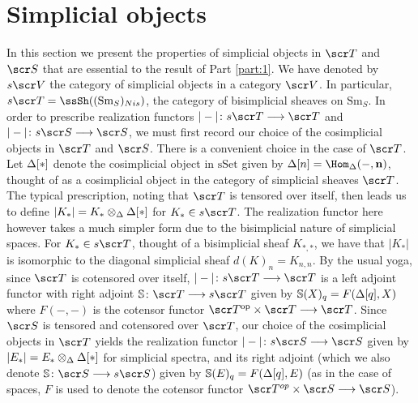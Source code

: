 \documentclass{amsart}
\theoremstyle{definition}
\begin{document}
\section{Simplicial objects}\label{sec:simpob}
In this section we present the properties of simplicial objects in $\sT$ and $\sS$ that are essential to the result of Part \ref{part:1}. We have denoted by $s\sV$ the category of simplicial objects in a category $\sV$. In particular, $s\sT = \ssSh((\mathrm{Sm}_S)_{Nis})$, the category of bisimplicial sheaves on $\mathrm{Sm}_S$. In order to prescribe realization functors $|-| \colon s\sT \rtarr \sT$ and $|-| \colon s\sS \rtarr \sS$, we must first record our choice of the cosimplicial objects in $\sT$ and $\sS$. There is a convenient choice in the case of $\sT$. Let $\Delta[*]$ denote the cosimplicial object in $\mathrm{sSet}$ given by $\DE[n]=\Hom_{\DE}(-,\mathbf{n})$, thought of as a cosimplicial object in the category of simplicial sheaves $\sT$. The typical prescription, noting that $\sT$ is tensored over itself, then leads us to define $|K_*| = K_* \otimes_{\Delta} \Delta[*]$ for $K_* \in s\sT$. The realization functor here however takes a much simpler form due to the bisimplicial nature of simplicial spaces. For $K_* \in s\sT$, thought of a bisimplicial sheaf $K_{*,*}$, we have that $|K_*|$ is isomorphic to the diagonal simplicial sheaf $d(K)_n = K_{n,n}$. By the usual yoga, since $\sT$ is cotensored over itself, $|-| \colon s\sT \rtarr \sT$ is a left adjoint functor with right adjoint $\bS \colon \sT \rtarr s\sT$ given by $\mathbb{S}(X)_q = F(\Delta[q],X)$ where $F(-,-)$ is the cotensor functor $\sT^{\mathrm{op}} \times \sT \rtarr \sT$. Since $\sS$ is tensored and cotensored over $\sT$, our choice of the cosimplicial objects in $\sT$ yields the realization functor $|-| \colon s\sS \rtarr \sS$ given by $|E_*| = E_* \otimes_{\Delta} \Delta[*]$ for simplicial spectra, and its right adjoint (which we also denote $\bS \colon \sS \rtarr s\sS$) given by $\mathbb{S}(E)_q = F(\Delta[q],E)$ (as in the case of spaces, $F$ is used to denote the cotensor functor $\sT^{op} \times \sS \rtarr \sS$).
\end{document}
